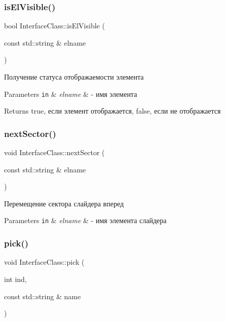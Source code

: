 \subsubsection{\texorpdfstring{is\+El\+Visible()}{isElVisible()}}
{\footnotesize\ttfamily bool Interface\+Class\+::is\+El\+Visible (\begin{DoxyParamCaption}\item[{const std\+::string \&}]{elname }\end{DoxyParamCaption})}



Получение статуса отображаемости элемента 


\begin{DoxyParams}[1]{Parameters}
\mbox{\tt in}  & {\em elname} & -\/ имя элемента \\
\hline
\end{DoxyParams}
\begin{DoxyReturn}{Returns}
true, если элемент отображается, false, если не отображается 
\end{DoxyReturn}
\mbox{\label{class_interface_class_abf7f2d3ebf23ef44e6f3c02e58aba3bc}} 
\subsubsection{\texorpdfstring{next\+Sector()}{nextSector()}}
{\footnotesize\ttfamily void Interface\+Class\+::next\+Sector (\begin{DoxyParamCaption}\item[{const std\+::string \&}]{elname }\end{DoxyParamCaption})}



Перемещение сектора слайдера вперед 


\begin{DoxyParams}[1]{Parameters}
\mbox{\tt in}  & {\em elname} & -\/ имя элемента слайдера \\
\hline
\end{DoxyParams}
\mbox{\label{class_interface_class_a62cd71d5b9325b648916eac7773801b8}} 
\subsubsection{\texorpdfstring{pick()}{pick()}}
{\footnotesize\ttfamily void Interface\+Class\+::pick (\begin{DoxyParamCaption}\item[{int}]{ind,  }\item[{const std\+::string \&}]{name }\end{DoxyParamCaption})}



